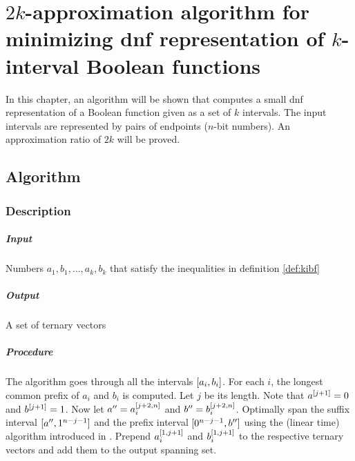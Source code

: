 \chapter{\texorpdfstring{$2k$}{2k}-approximation algorithm
for minimizing \texorpdfstring{\acrshort{dnf}}{DNF} representation
of \texorpdfstring{$k$}{k}-interval Boolean functions}
\label{chap:2kapprox}

In this chapter,
an algorithm will be shown that computes
a small \acrshort{dnf} representation
of a Boolean function given as a set of $k$ intervals.
The input intervals are represented by pairs of endpoints
($n$-bit numbers).
An approximation ratio of $2k$ will be proved.

\section{Algorithm}

\subsection{Description}
\paragraph{Input}
Numbers $a_1, b_1, \ldots, a_k, b_k$
that satisfy the inequalities in definition \ref{def:kibf}

\paragraph{Output}
A set of ternary vectors

\paragraph{Procedure}
The algorithm goes through
all the intervals $[a_i, b_i]$.
For each $i$, the longest common prefix of $a_i$ and $b_i$
is computed. Let $j$ be its length.
Note that $a^{[j+1]} = 0$ and $b^{[j+1]} = 1$.
Now let $a'' = a_i^{[j+2, n]}$
and $b'' = b_i^{[j+2, n]}$.
Optimally span the suffix interval
$[a'', 1^{n-j-1}]$
and the prefix interval
$[0^{n-j-1}, b'']$
using the (linear time) algorithm
introduced in \cite{Schieber2005154}.
Prepend $a_i^{[1, j+1]}$
and $b_i^{[1, j+1]}$
to the respective ternary vectors
and add them to the output spanning set.


